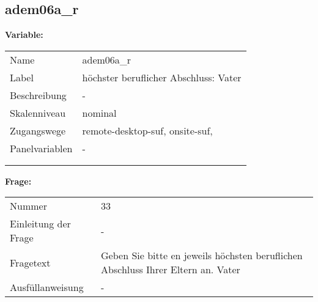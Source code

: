 	
	
	\subsection{adem06a\_r}
	\label{subSection:adem06a_r}

	\noindent\textbf{Variable:}\\
		\begin{tabular}{lL{11.3cm}}
			\label{tableVariable:adem06a_r}
			Name & adem06a\_r \\
			Label & höchster beruflicher Abschluss: Vater \\
			Beschreibung & - \\
			Skalenniveau & nominal \\
			Zugangswege &
				remote-desktop-suf,
				onsite-suf,
 \\
			Panelvariablen & -
			 \\
			 \\
 \\
		\end{tabular}

		\vspace*{1 cm}
		\noindent\textbf{Frage:}\\
		\begin{tabular}{lL{11.3cm}}
			\label{tableQuestion:adem06a_r}
			Nummer & 33 \\
			Einleitung der Frage & - \\
			Fragetext & Geben Sie bitte en jeweils höchsten beruflichen Abschluss Ihrer Eltern an.
Vater \\
			Ausfüllanweisung & - \\
		\end{tabular}





